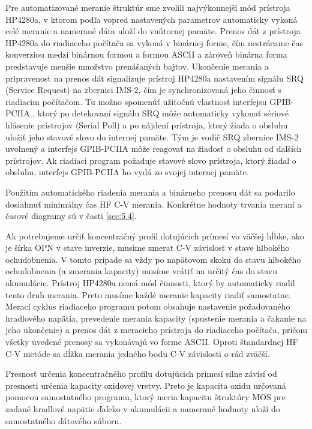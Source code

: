 Pre automatizované meranie štruktúr sme zvolili najvýkonnejší mód
prístroja HP4280a, v ktorom podľa vopred nastavených parametrov
automaticky vykoná celé meranie a namerané dáta uloží do vnútornej
pamäte.  Prenos dát z prístroja HP4280a do riadiaceho počítača sa
vykoná v binárnej forme, čím nestrácame čas konverziou medzi binárnou
formou a formou ASCII a zároveň binárna forma predstavuje menšie
množstvo prenášaných bajtov. Ukončenie merania a pripravenosť na
prenos dát signalizuje prístroj HP4280a nastavením signálu SRQ
(Service Request) na zbernici IMS-2, čím je synchronizovaná jeho
činnosť s riadiacim počítačom.  Tu možno spomenúť užitočnú vlastnosť
interfejsu GPIB-PCIIA \cite{5.2}, ktorý po detekovaní signálu SRQ môže
automaticky vykonať sériové hlásenie prístrojov (Serial Poll) a po
nájdení prístroja, ktorý žiada o obsluhu uložiť jeho stavové slovo do
internej pamäte. Tým je vodič SRQ zbernice IMS-2 uvolnený a interfejs
GPIB-PCIIA môže reagovať na žiadosť o obsluhu od ďalších
prístrojov. Ak riadiaci program požaduje stavové slovo prístroja,
ktorý žiadal o obsluhu, interfejs GPIB-PCIIA ho vydá zo svojej
internej pamäte.

Použitím automatického riadenia merania a binárneho prenosu dát sa
podarilo dosiahnuť minimálny čas HF C-V merania.  Konkrétne hodnoty
trvania meraní a časové diagramy sú v časti \ref{sec:5.4}.

Ak potrebujeme určiť koncentračný profil dotujúcich prímesí vo väčšej
hĺbke, ako je šírka OPN v stave inverzie, musime zmerat C-V závislosť
v stave hlbokého ochudobnenia. V tomto prípade sa vždy po napäťovom
skoku do stavu hlbokého ochudobnenia (a zmerania kapacity) musíme
vrátiť na určitý čas do stavu akumulácie. Prístroj HP4280a nemá mód
činnosti, ktorý by automaticky riadil tento druh merania. Preto musíme
každé meranie kapacity riadiť samostatne. Merací cyklus riadiaceho
programu potom obsahuje nastavenie požadovaného hradlového napätia,
prevedenie merania kapacity (spustenie merania a čakanie na jeho
ukončenie) a prenos dát z meracieho prístroja do riadiaceho počítača,
pričom všetky uvedené prenosy sa vykonávajú vo forme ASCII. Oproti
štandardnej HF C-V metóde sa dĺžka merania jedného bodu C-V závislosti
o rád zväčší.

Presnosť určenia koncentračného profilu dotujúcich prímesí silne
závisí od presnosti určenia kapacity oxidovej vrstvy.  Preto je
kapacita oxidu určovaná pomocou samostatného programu, ktorý meria
kapacitu štruktúry MOS pre zadané hradlové napätie ďaleko v akumulácii
a namerané hodnoty uloží do samostatného dátového súboru.


